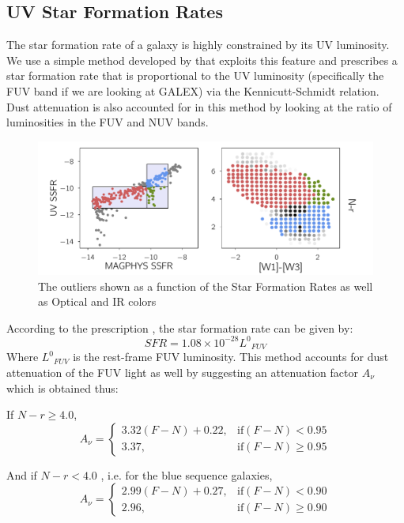 \documentclass[iop]{emulateapj}
\begin{document}
\subsection{UV Star Formation Rates}
The star formation rate of a galaxy is highly constrained by its UV luminosity. We use a simple method developed by \citet{Sal07} that exploits this feature and prescribes a star formation rate that is proportional to the UV luminosity (specifically the FUV band if we are looking at GALEX)  via the Kennicutt-Schmidt relation. Dust attenuation is also accounted for in this method by looking at the ratio of luminosities in the FUV and NUV bands.\\

\begin{figure}
	\centering
		\includegraphics[width = 16 cm, height = 6.4 cm]{outliers.pdf}
	\caption{The outliers shown as a function of the Star Formation Rates as well as Optical and IR colors} 
\end{figure}
According to the prescription \cite[]{Sal07}, the star formation rate can be given by:
$$ SFR = 1.08 \times 10^{-28}{L^{0}}_{FUV} $$
Where ${L^{0}}_{FUV}$ is the rest-frame FUV luminosity. This method accounts for dust attenuation of the FUV light as well by suggesting an attenuation factor $A_{\nu}$ which is obtained thus:

If $N-r \geq 4.0$,\\
$$ A_{\nu} = 
\begin{cases} 3.32 (F-N) + 0.22, & \text{if} (F-N) < 0.95\\
3.37, & \text{if} (F-N) \geq 0.95 
\end{cases}$$

And if $N-r < 4.0$ , i.e. for the blue sequence galaxies,\\
$$A_{\nu} = 
\begin{cases} 2.99(F-N) + 0.27, & \text{if}(F-N) < 0.90\\
2.96, & \text{if} (F-N) \geq 0.90 
\end{cases}$$\\
\end{document}
